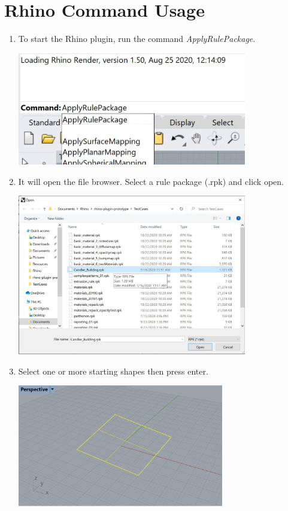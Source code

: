 \section{Rhino Command Usage}

\begin{enumerate}
    \item To start the Rhino plugin, run the command \textit{ApplyRulePackage}.\\
    \begin{minipage}{\linewidth}
        \centering
        \includegraphics[width=10cm]{res/man_rhino_cmd}
    \end{minipage}
    \item It will open the file browser. Select a rule package (.rpk) and click open.\\
    \begin{minipage}{\linewidth}
        \centering
        \includegraphics[width=10cm]{res/man_rhino_rpk_browser}
    \end{minipage}
    \newpage
    \item Select one or more starting shapes then press enter.\\
    \begin{minipage}{\linewidth}
        \centering
        \includegraphics[width=9cm]{res/man_rhino_pick_shape}

\end{minipage}
\end{enumerate}
